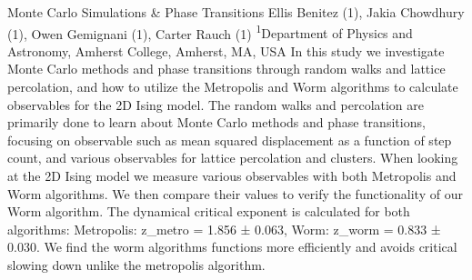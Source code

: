 \makeabstract
{
Monte Carlo Simulations \& Phase Transitions
}
{
Ellis Benitez (1), Jakia Chowdhury (1), Owen Gemignani (1), Carter Rauch (1)
}
{
\textsuperscript{1}Department of Physics and Astronomy, Amherst College, Amherst, MA, USA
}
{
In this study we investigate Monte Carlo methods and phase transitions through random walks and lattice percolation, and how to utilize the Metropolis and Worm algorithms to calculate observables for the 2D Ising model. The random walks and percolation are primarily done to learn about Monte Carlo methods and phase transitions, focusing on observable such as mean squared displacement as a function of step count, and various observables for lattice percolation and clusters.
}
{
When looking at the 2D Ising model we measure various observables with both Metropolis and Worm algorithms. We then compare their values to verify the functionality of our Worm algorithm. 
}
{
The dynamical critical exponent is
calculated for both algorithms: Metropolis: z\_metro = 1.856 ± 0.063, Worm: z\_worm = 0.833 ± 0.030.
}
{
We find the worm algorithms functions more efficiently and avoids critical slowing down unlike the metropolis algorithm.
}

\newpage
